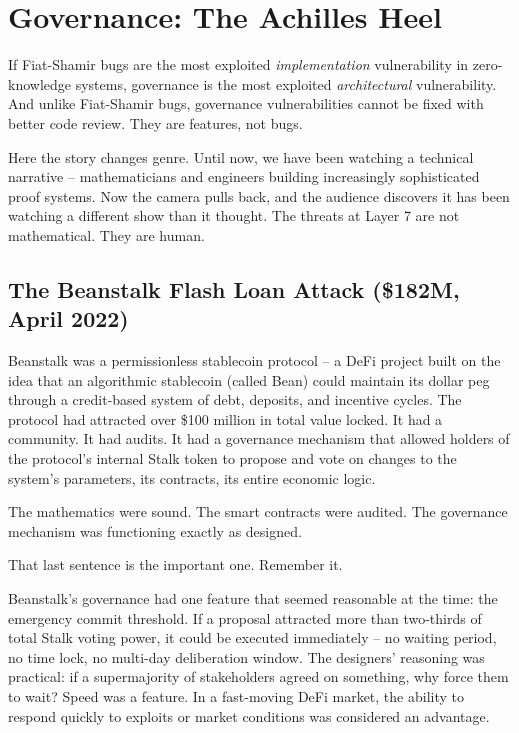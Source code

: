 \documentclass[
  11pt,
  openany]{report}
\begin{document}
\section{Governance: The Achilles Heel}\label{governance-the-achilles-heel}

If Fiat-Shamir bugs are the most exploited \emph{implementation} vulnerability
in zero-knowledge systems, governance is the most exploited \emph{architectural}
vulnerability. And unlike Fiat-Shamir bugs, governance vulnerabilities cannot be
fixed with better code review. They are features, not bugs.

Here the story changes genre. Until now, we have been watching a technical
narrative -- mathematicians and engineers building increasingly sophisticated
proof systems. Now the camera pulls back, and the audience discovers it has been
watching a different show than it thought. The threats at Layer 7 are not
mathematical. They are human.

\subsection{The Beanstalk Flash Loan Attack (\$182M, April
2022)}\label{the-beanstalk-flash-loan-attack-182m-april-2022}

Beanstalk was a permissionless stablecoin protocol -- a DeFi project built on
the idea that an algorithmic stablecoin (called Bean) could maintain its dollar
peg through a credit-based system of debt, deposits, and incentive cycles. The
protocol had attracted over \$100 million in total value locked. It had a
community. It had audits. It had a governance mechanism that allowed holders of
the protocol's internal Stalk token to propose and vote on changes to the
system's parameters, its contracts, its entire economic logic.

The mathematics were sound. The smart contracts were audited. The governance
mechanism was functioning exactly as designed.

That last sentence is the important one. Remember it.

Beanstalk's governance had one feature that seemed reasonable at the time: the
emergency commit threshold. If a proposal attracted more than two-thirds of
total Stalk voting power, it could be executed immediately -- no waiting period,
no time lock, no multi-day deliberation window. The designers' reasoning was
practical: if a supermajority of stakeholders agreed on something, why force
them to wait? Speed was a feature. In a fast-moving DeFi market, the ability to
respond quickly to exploits or market conditions was considered an advantage.
\end{document}
